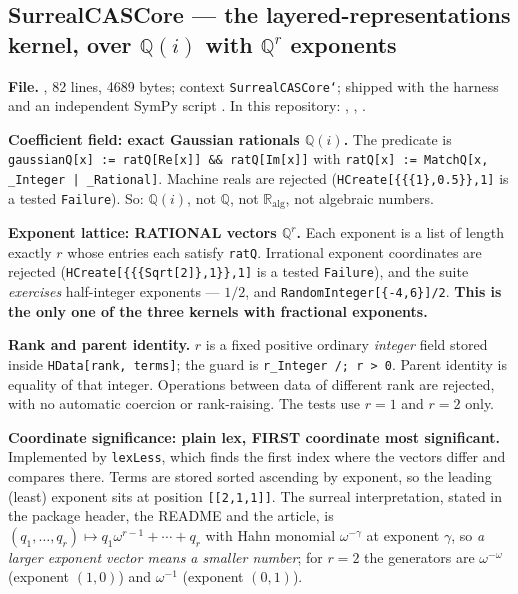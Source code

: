 \documentclass[11pt,letterpaper]{article}
\numberwithin{equation}{section}
\theoremstyle{definition}
\theoremstyle{remark}
\newcommand{\Q}{\mathbb Q}
\newcommand{\RA}{\mathbb R_{\mathrm{alg}}}
\begin{document}
\subsection{SurrealCASCore --- the layered-representations kernel, over \texorpdfstring{$\Q(i)$ with $\Q^r$}{Q(i) with Q\textasciicircum r} exponents}
\label{cas:sub-surrealcascore}
\textbf{File.} , 82 lines, 4689 bytes; context
\texttt{SurrealCASCore`}; shipped with the harness  and an
independent SymPy script . In this repository:
,
,
.

\textbf{Coefficient field: exact Gaussian rationals $\Q(i)$.} The predicate is
\texttt{gaussianQ[x] := ratQ[Re[x]] \&\& ratQ[Im[x]]} with
\texttt{ratQ[x] := MatchQ[x, \_Integer | \_Rational]}. Machine reals are
rejected (\texttt{HCreate[\{\{\{1\},0.5\}\},1]} is a tested \texttt{Failure}).
So: $\Q(i)$, not $\Q$, not $\RA$, not algebraic numbers.

\textbf{Exponent lattice: RATIONAL vectors $\Q^r$.} Each exponent is a list of
length exactly $r$ whose entries each satisfy \texttt{ratQ}. Irrational exponent
coordinates are rejected (\texttt{HCreate[\{\{\{Sqrt[2]\},1\}\},1]} is a tested
\texttt{Failure}), and the suite \emph{exercises} half-integer exponents ---
$1/2$, and \texttt{RandomInteger[\{-4,6\}]/2}. \textbf{This is the only one of
the three kernels with fractional exponents.}

\textbf{Rank and parent identity.} $r$ is a fixed positive ordinary
\emph{integer} field stored inside \texttt{HData[rank, terms]}; the guard is
\texttt{r\_Integer /; r > 0}. Parent identity is equality of that integer.
Operations between data of different rank are rejected, with no automatic
coercion or rank-raising. The tests use $r=1$ and $r=2$ only.

\textbf{Coordinate significance: plain lex, FIRST coordinate most significant.}
Implemented by \texttt{lexLess}, which finds the first index where the vectors
differ and compares there. Terms are stored sorted ascending by exponent, so the
leading (least) exponent sits at position \texttt{[[2,1,1]]}. The surreal
interpretation, stated in the package header, the README and the article, is
$(q_1,\dots,q_r)\mapsto q_1\omega^{r-1}+\cdots+q_r$ with Hahn monomial
$\omega^{-\gamma}$ at exponent $\gamma$, so \emph{a larger exponent vector means
a smaller number}; for $r=2$ the generators are $\omega^{-\omega}$ (exponent
$(1,0)$) and $\omega^{-1}$ (exponent $(0,1)$).
\end{document}
